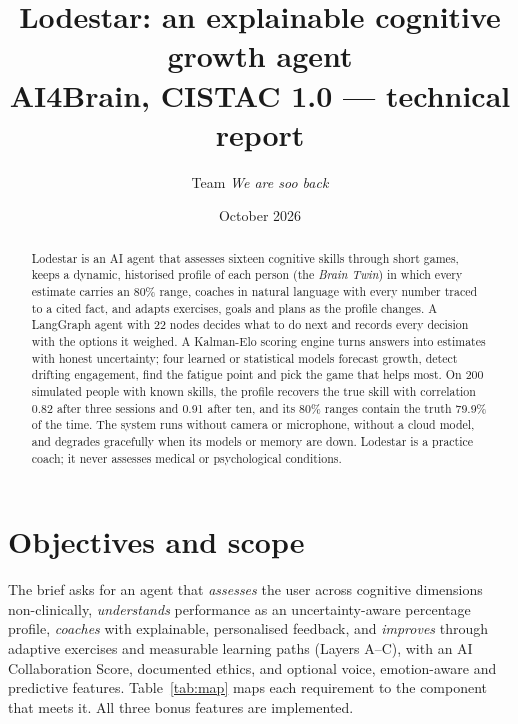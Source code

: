 \documentclass[10pt,a4paper]{article}
\title{\textbf{Lodestar: an explainable cognitive growth agent}\\[2pt]
\large AI4Brain, CISTAC 1.0 --- technical report}
\author{Team \emph{We are soo back}}
\date{October 2026}
\begin{document}
\maketitle
\vspace{-1.5em}

\begin{abstract}
\noindent Lodestar is an AI agent that assesses sixteen cognitive skills through short games, keeps a
dynamic, historised profile of each person (the \emph{Brain Twin}) in which every estimate carries an
80\% range, coaches in natural language with every number traced to a cited fact, and adapts
exercises, goals and plans as the profile changes. A LangGraph agent with 22 nodes decides what to do
next and records every decision with the options it weighed. A Kalman-Elo scoring engine turns
answers into estimates with honest uncertainty; four learned or statistical models forecast growth,
detect drifting engagement, find the fatigue point and pick the game that helps most. On 200
simulated people with known skills, the profile recovers the true skill with correlation 0.82 after
three sessions and 0.91 after ten, and its 80\% ranges contain the truth 79.9\% of the time. The
system runs without camera or microphone, without a cloud model, and degrades gracefully when its
models or memory are down. Lodestar is a practice coach; it never assesses medical or psychological
conditions.
\end{abstract}

\section{Objectives and scope}
The brief asks for an agent that \emph{assesses} the user across cognitive dimensions
non-clinically, \emph{understands} performance as an uncertainty-aware percentage profile,
\emph{coaches} with explainable, personalised feedback, and \emph{improves} through adaptive exercises
and measurable learning paths (Layers A--C), with an AI Collaboration Score, documented ethics, and
optional voice, emotion-aware and predictive features. Table~\ref{tab:map} maps each requirement to
the component that meets it. All three bonus features are implemented.
\end{document}
